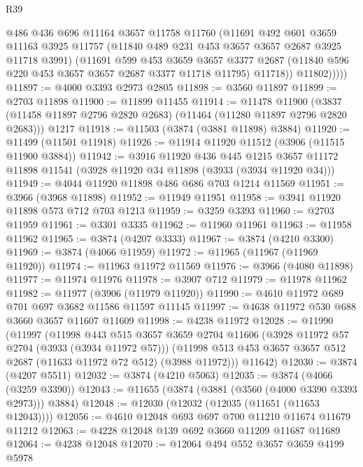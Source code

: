 \begin{lexlean}{R39}
\begin{coremodule}
              @486
              @436
              @696
              @11164
              @3657
              @11758
              @11760
              (@11691
                @492
                @601
                @3659
                @11163
                @3925
                @11757
                (@11840 @489 @231 @453 @3657 @3657 @2687 @3925 @11718 @3991)
                (@11691
                  @599
                  @453
                  @3659
                  @3657
                  @3377
                  @2687
                  (@11840 @596 @220 @453 @3657 @3657 @2687 @3377 @11718 @11795)
                  @11718))
              @11802)))))
@11897 := @4000 @3393 @2973 @2805
@11898 := @3560 @11897
@11899 := @2703 @11898
@11900 := @11899 @11455
@11914 := @11478
    @11900
    (@3837 (@11458 @11897 @2796 @2820 @2683) (@11464 (@11280 @11897 @2796 @2820 @2683)))
    @1217
@11918 := @11503 (@3874 (@3881 @11898) @3884)
@11920 := @11499 (@11501 @11918)
@11926 := @11914 @11920 @11512 (@3906 (@11515 @11900 @3884))
@11942 := @3916
    @11920
    @436
    @445
    @1215
    @3657
    @11172
    @11898
    @11541
    (@3928 @11920 @34 @11898 (@3933 (@3934 @11920 @34)))
@11949 := @4044 @11920 @11898 @486 @686 @703 @1214 @11569
@11951 := @3966 (@3968 @11898)
@11952 := @11949 @11951
@11958 := @3941 @11920 @11898 @573 @712 @703 @1213
@11959 := @3259 @3393
@11960 := @2703 @11959
@11961 := @3301 @3335
@11962 := @11960 @11961
@11963 := @11958 @11962
@11965 := @3874 (@4207 @3333)
@11967 := @3874 (@4210 @3300)
@11969 := @3874 (@4066 @11959)
@11972 := @11965 (@11967 (@11969 @11920))
@11974 := @11963 @11972 @11569
@11976 := @3966 (@4080 @11898)
@11977 := @11974 @11976
@11978 := @3907 @712
@11979 := @11978 @11962
@11982 := @11977 (@3906 (@11979 @11920))
@11990 := @4610 @11972 @689 @701 @697 @3682 @11586 @11597 @11145
@11997 := @4638 @11972 @530 @688 @3660 @3657 @11607 @11609
@11998 := @4238 @11972
@12028 := @11990
    (@11997
      (@11998
        @443
        @515
        @3657
        @3659
        @2704
        @11606
        (@3928 @11972 @57 @2704 (@3933 (@3934 @11972 @57)))
        (@11998 @513 @453 @3657 @3657 @512 @2687 (@11633 @11972 @72 @512) (@3988 @11972)))
      @11642)
@12030 := @3874 (@4207 @5511)
@12032 := @3874 (@4210 @5063)
@12035 := @3874 (@4066 (@3259 @3390))
@12043 := @11655 (@3874 (@3881 (@3560 (@4000 @3390 @3393 @2973))) @3884)
@12048 := @12030 (@12032 (@12035 (@11651 (@11653 @12043))))
@12056 := @4610 @12048 @693 @697 @700 @11210 @11674 @11679 @11212
@12063 := @4228 @12048 @139 @692 @3660 @11209 @11687 @11689
@12064 := @4238 @12048
@12070 := @12064 @494 @552 @3657 @3659 @4199 @5978

\end{coremodule}
\end{lexlean}
